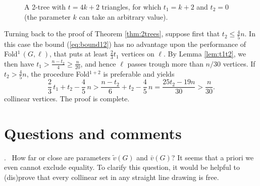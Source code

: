 \documentclass[reqno,12pt]{amsart}
\newcommand{\lin}[1]{\bar v(#1)}
\newcommand{\free}[1]{\tilde v(#1)}
\newcommand{\foldn}[1]{{\sc Fold}$^{#1}$}
\newcommand{\fold}[2]{{\sc Fold}$^{#1}\,(#2)$}
\newcommand{\refeq}[1]{(\ref{eq:#1})}
\newcounter{oq}
\newcommand{\que}{\refstepcounter{oq}\par{\sc \theoq.}~}
\begin{document}
\begin{figure}[b]
\centering
\caption{A 2-tree with  $t=4k+2$ triangles, for which $t_1=k+2$ and $t_2=0$
(the parameter $k$ can take an arbitrary value).}
\label{fig:4best}
\end{figure}


Turning back to the proof of Theorem \ref{thm:2trees}, suppose first that $t_2\le\frac45n$.
In this case the bound \refeq{bound12} has no advantage upon the performance of
\fold1{G,\ell}, that puts at least $\frac23t_1$ vertices on $\ell$.
By Lemma \ref{lem:t1t2}, we then have $t_1>\frac{n-t_2}4\ge\frac n{20}$,
and hence $\ell$ passes trough more than $n/30$ vertices.
If $t_2>\frac45n$, the procedure \foldn{1+2} is preferable and yields
$$
\frac23\,t_1+t_2-\frac45\,n>\frac{n-t_2}6+t_2-\frac45\,n=\frac{25t_2-19n}{30}>\frac n{30}.
$$
collinear vertices. The proof is complete.





\section{Questions and comments}\label{s:open}
\mbox{}

\que
How far or close are parameters $\free G$ and $\lin G$?
It seems that a priori we even cannot exclude equality.
To clarify this question, it would be helpful to (dis)prove that every collinear set 
in any straight line drawing is free.
\end{document}
